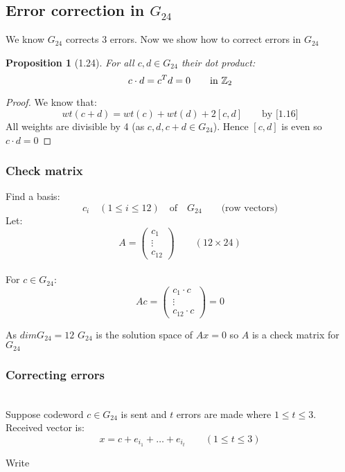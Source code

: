 \documentclass[]{article}
\newtheorem{prop}[thm]{Proposition}
\theoremstyle{definition}
\theoremstyle{remark}
\numberwithin{equation}{section}
\begin{document}
	\subsection{Error correction in \texorpdfstring{$G_{24}$}{G24}}
		We know $G_{24}$ corrects 3 errors. Now we show how to correct errors in $G_{24}$
		\begin{prop}[1.24]
			For all $c,d \in G_{24}$ their dot product:
			\[
				c \cdot d = c^Td = 0 \qquad \text{in $\mathbb{Z}_2$}
			\]
		\end{prop}

		\begin{proof}
		We know that:
		\[
			wt(c+d) = wt(c) + wt(d) + 2[c,d] \qquad \text{by [1.16]}
		\]
		All weights are divisible by 4 (as $c,d, c+d \in G_{24}$). Hence $[c,d]$ is even so $c\cdot d = 0$

		\end{proof}

		\subsubsection{Check matrix} Find a basis:
		\[
			c_i \quad (1\leq i \leq 12) \quad \text{of} \quad G_{24} \qquad \text{(row vectors)}
		\]
		Let:
		\[
			A  =\begin{pmatrix}
				c_1\\
				\vdots \\
				c_12
				\end{pmatrix} \qquad (12 \times 24)
		\]\hfill\\
		For $c \in G_{24}$:
		\[
			Ac = \begin{pmatrix}
				c_1 \cdot c\\
				\vdots \\
				c_12 \cdot c
				\end{pmatrix} = 0
		\]

		As $dim G_{24} = 12$ $G_{24}$ is the solution space of $Ax = 0$ so $A$ is a check matrix for $G_{24}$

		\subsubsection{Correcting errors}\hfill\\
		Suppose codeword $c\in G_{24}$ is sent and $t$ errors are made where $1 \leq t \leq 3$.\\
		Received vector is:
		\[
			x = c + e_{i_1} + \hdots + e_{i_t} \qquad (1 \leq t \leq 3)
		\]

		Write
\end{document}
